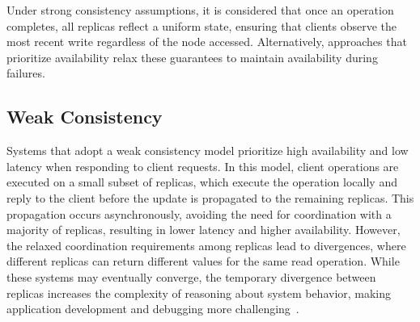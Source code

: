Under strong consistency assumptions, it is considered that once an operation completes, all replicas reflect a uniform state, ensuring that clients observe the most recent write regardless of the node accessed. Alternatively, approaches that prioritize availability relax these guarantees to maintain availability during failures.

\subsection{Weak Consistency}
\label{sub:weak}

Systems that adopt a weak consistency model prioritize high availability and low latency when responding to client requests. In this model, client operations are executed on a small subset of replicas, which execute the operation locally and reply to the client before the update is propagated to the remaining replicas. This propagation occurs asynchronously, avoiding the need for coordination with a majority of replicas, resulting in lower latency and higher availability. However, the relaxed coordination requirements among replicas lead to divergences, where different replicas can return different values for the same read operation. While these systems may eventually converge, the temporary divergence between replicas increases the complexity of reasoning about system behavior, making application development and debugging more challenging~\cite{preguica2018overview}.

